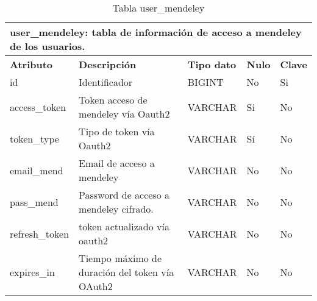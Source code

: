 \begin{table}[!hbt]
	\begin{center}
		\begin{tabular}{|p{3cm}|p{4cm}|p{4cm}|p{2cm}|p{2cm}|}
			\hline
			\multicolumn{5}{|l|}{\textbf{user\_mendeley:} tabla de información de acceso a mendeley de los usuarios.} \\
			\hline
			\hline
			\textbf{Atributo} & \textbf{Descripción} & \textbf{Tipo dato} & \textbf{Nulo} & \textbf{Clave}\\
			\hline
			id & Identificador  & BIGINT & No & Si\\
			\hline
			access\_token & Token acceso de mendeley vía Oauth2  & VARCHAR & Si & No\\
			\hline
			token\_type & Tipo de token vía Oauth2  & VARCHAR & Sí & No\\
			\hline
			email\_mend & Email de acceso a mendeley & VARCHAR & No & No\\
			\hline
			pass\_mend & Password de acceso a mendeley cifrado. & VARCHAR & No & No\\
			\hline
			refresh\_token & token actualizado vía oauth2 & VARCHAR & No & No\\
			\hline
			expires\_in & Tiempo máximo de duración del token vía OAuth2 & VARCHAR & No & No\\
			\hline
		\end{tabular}
		\caption{Tabla user\_mendeley}
		\label{table:db-usermendeley}
	\end{center}
\end{table}

